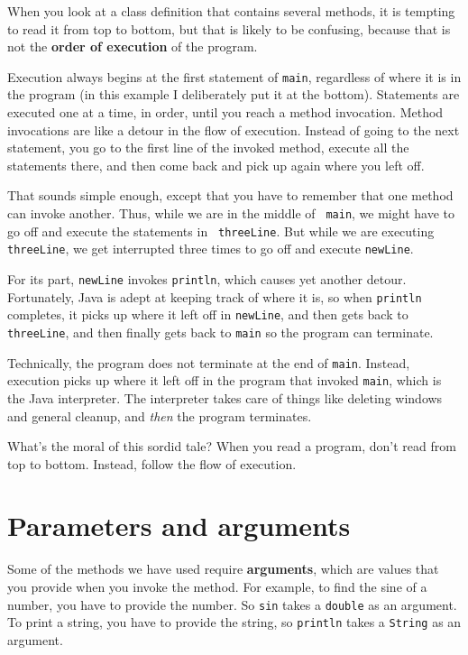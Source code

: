 \documentclass[12pt]{book}
\theoremstyle{definition}
\begin{document}
When you look at a class definition that contains several methods, it
is tempting to read it from top to bottom, but that is likely to be
confusing, because that is not the {\bf order of execution} of the
program.

Execution always begins at the first statement of {\tt main},
regardless of where it is in the program (in this example I deliberately
put it at the bottom).  Statements are executed one at a time, in
order, until you reach a method invocation.  Method invocations are
like a detour in the flow of execution.  Instead of going to the next
statement, you go to the first line of the invoked method, execute all
the statements there, and then come back and pick up again where you
left off.

That sounds simple enough, except that you have to remember that one
method can invoke another.  Thus, while we are in the middle of {\tt
main}, we might have to go off and execute the statements in {\tt
threeLine}.  But while we are executing {\tt threeLine}, we get
interrupted three times to go off and execute {\tt newLine}.

For its part, {\tt newLine} invokes
{\tt println}, which causes yet another detour.  Fortunately,
Java is adept at keeping track of where it is, so when
{\tt println} completes, it picks up where it left off in
{\tt newLine}, and then gets back to {\tt threeLine}, and then
finally gets back to {\tt main} so the program can terminate.

Technically, the program does not terminate at the
end of {\tt main}.  Instead, execution picks up where it left
off in the program that invoked {\tt main}, which is the
Java interpreter.  The interpreter takes care of things
like deleting windows and general cleanup, and {\em then}
the program terminates.

What's the moral of this sordid tale?  When you
read a program, don't read from top to bottom.  Instead,
follow the flow of execution.


\section {Parameters and arguments}

Some of the methods we have used require {\bf arguments},
which are values that you provide when you invoke the method.
For example, to find the sine of a number,
you have to provide the number.  So {\tt sin}
takes a {\tt double} as an argument.  To print a string,
you have to provide the string, so {\tt println}
takes a {\tt String} as an argument.
\end{document}
